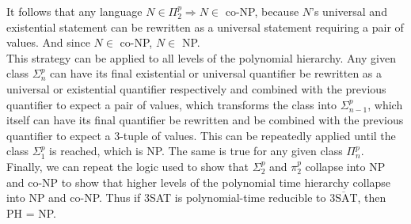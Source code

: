 \documentclass[letterpaper,notitlepage,twoside]{article}
\renewcommand{\implies}{\Rightarrow} %
\begin{document}
It follows that any language $N \in \Pi_2^p \implies N \in$ co-NP, because $N$'s universal and existential statement can be rewritten as a universal statement requiring a pair of values. And since $N \in$ co-NP, $N \in$ NP. \\

This strategy can be applied to all levels of the polynomial hierarchy. Any given class $\Sigma_n^p$ can have its final existential or universal quantifier be rewritten as a universal or existential quantifier respectively and combined with the previous quantifier to expect a pair of values, which transforms the class into $\Sigma_{n-1}^p$, which itself can have its final  quantifier be rewritten and be combined with the previous quantifier to expect a 3-tuple of values. This can be repeatedly applied until the class $\Sigma_1^p$ is reached, which is NP. The same is true for any given class $\Pi_n^p$. \\

Finally, we can repeat the logic used to show that $\Sigma_2^p$ and $\pi_2^p$ collapse into NP and co-NP to show that higher levels of the polynomial time hierarchy collapse into NP and co-NP. Thus if 3SAT is polynomial-time reducible to $\overline{\text{3SAT}}$, then PH = NP.
\end{document}
